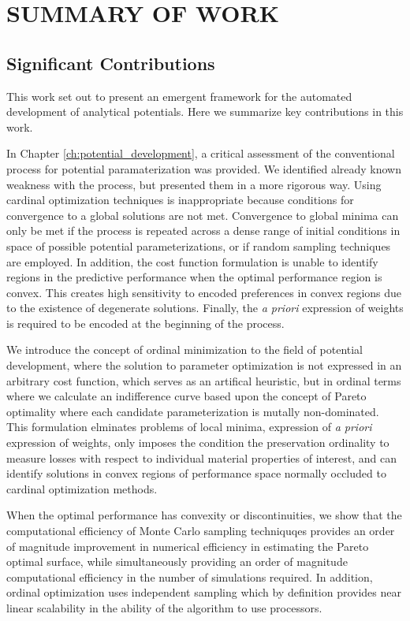 \chapter{SUMMARY OF WORK}
\label{ch:summary}

\section{Significant Contributions}
This work set out to present an emergent framework for the automated development of analytical potentials.  Here we summarize key contributions in this work.

In Chapter \ref{ch:potential_development}, a critical assessment of the conventional process for potential paramaterization was provided.  We identified already known weakness with the process, but presented them in a more rigorous way.  Using cardinal optimization techniques is inappropriate because conditions for convergence to a global solutions are not met.  Convergence to global minima can only be met if the process is repeated across a dense range of initial conditions in space of possible potential parameterizations, or if random sampling techniques are employed.  In addition, the cost function formulation is unable to identify regions in the predictive performance when the optimal performance region is convex.  This creates high sensitivity to encoded preferences in convex regions due to the existence of degenerate solutions.  Finally, the \emph{a priori} expression of weights is required to be encoded at the beginning of the process.

We introduce the concept of ordinal minimization to the field of potential development, where the solution to parameter optimization is not expressed in an arbitrary cost function, which serves as an artifical heuristic, but in ordinal terms where we calculate an indifference curve based upon the concept of Pareto optimality where each candidate parameterization is mutally non-dominated.  This formulation elminates problems of local minima, expression of \emph{a priori} expression of weights, only imposes the condition the preservation ordinality to measure losses with respect to individual material properties of interest, and can identify solutions in convex regions of performance space normally occluded to cardinal optimization methods.

When the optimal performance has convexity or discontinuities, we show that the computational efficiency of Monte Carlo sampling techniquqes provides an order of magnitude improvement in  numerical efficiency in estimating the Pareto optimal surface, while simultaneously providing an order of magnitude computational efficiency in the number of simulations required.  In addition, ordinal optimization uses independent sampling which by definition provides near linear scalability in the ability of the algorithm to use processors.

